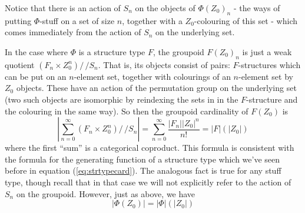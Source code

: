 \documentclass{amsart} \usepackage{amsmath,amssymb,bbm}
\begin{document}
Notice that there is an action of $S_n$ on the objects of $\Phi ( Z_0
)_n$ - the ways of putting $\Phi$-stuff on a set of size $n$, together
with a $Z_0$-colouring of this set - which comes immediately from the
action of $S_n$ on the underlying set.

In the case where $\Phi$ is a structure type $F$, the groupoid
$F(Z_0)_n$ is just a weak quotient $(F_n \times Z_0^n) /\,\!\!/ S_n$.
That is, its objects consist of pairs: $F$-structures which can be put
on an $n$-element set, together with colourings of an $n$-element set
by $Z_0$ objects.  These have an action of the permutation group on
the underlying set (two such objects are isomorphic by reindexing the
sets in in the $F$-structure and the colouring in the same way).  So
then the groupoid cardinality of $F(Z_0)$ is
\begin{equation}
| \sum_{n = 0}^\infty (F_n \times Z_0^n) /\,\!\!/ S_n | = \sum_{n=0}^\infty \frac{|F_n| |Z_0|^n}{n!} = |F|(|Z_0|)
\end{equation}
where the first ``sum'' is a categorical coproduct.  This formula is
consistent with the formula for the generating function of a structure
type which we've seen before in equation (\ref{eq:strtypecard}).  The
analogous fact is true for any stuff type, though recall that in that
case we will not explicitly refer to the action of $S_n$ on the
groupoid.  However, just as above, we have
\begin{equation}
| \Phi(Z_0) | = |\Phi|(|Z_0|)
\end{equation}
\end{document}
